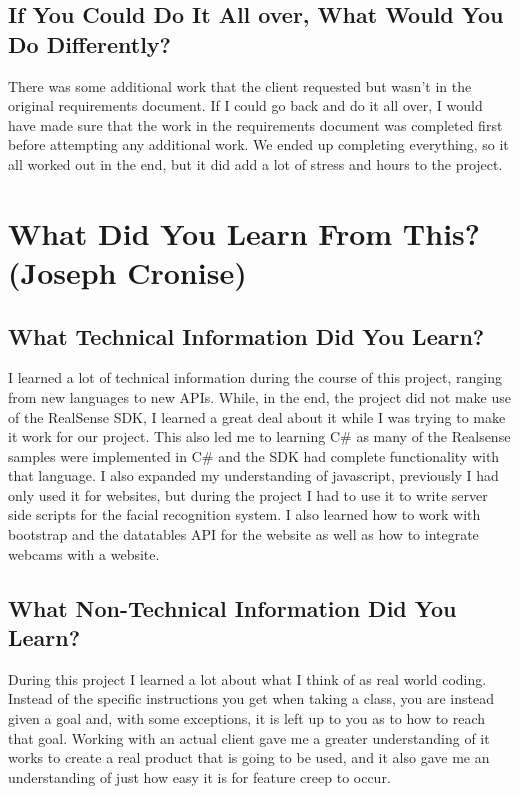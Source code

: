 \documentclass[10pt, onecolumn, twoside, peerreview]{IEEEtran}
\begin{document}
\subsection{If You Could Do It All over, What Would You Do Differently?}
There was some additional work that the client requested but wasn't in the original requirements document. If I could go back and do it all over, I would have made sure that the work in the requirements document was completed first before attempting any additional work. We ended up completing everything, so it all worked out in the end, but it did add a lot of stress and hours to the project.


\section{What Did You Learn From This? (Joseph Cronise)}
\subsection{What Technical Information Did You Learn?}
I learned a lot of technical information during the course of this project, ranging from new languages to new APIs. While, in the end, the project did not make use of the RealSense SDK, I learned a great deal about it while I was trying to make it work for our project. This also led me to learning C\# as many of the Realsense samples were implemented in C\# and the SDK had complete functionality with that language. I also expanded my understanding of javascript, previously I had only used it for websites, but during the project I had to use it to write server side scripts for the facial recognition system. I also learned how to work with bootstrap and the datatables API for the website as well as how to integrate webcams with a website.

\subsection{What Non-Technical Information Did You Learn?}
During this project I learned a lot about what I think of as real world coding. Instead of the specific instructions you get when taking a class, you are instead given a goal and, with some exceptions, it is left up to you as to how to reach that goal. Working with an actual client gave me a greater understanding of it works to create a real product that is going to be used, and it also gave me an understanding of just how easy it is for feature creep to occur.
\end{document}
